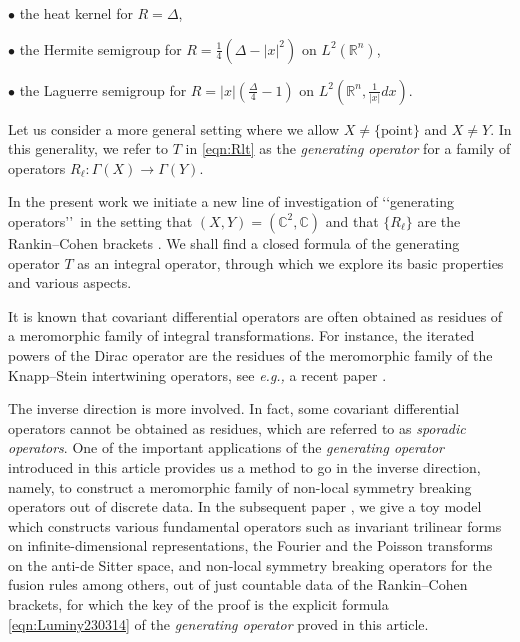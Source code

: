 \documentclass[12pt,leqno]{amsart}
\theoremstyle{plain}
\theoremstyle{definition}
\begin{document}
\par\indent
$\bullet$\enspace
 the heat kernel
 for $R=\Delta$, 

\par\indent
$\bullet$\enspace
the Hermite semigroup
 for $R=\frac 1 4 (\Delta-|x|^2)$  on $L^2({\mathbb{R}}^n)$, 

\par\indent
$\bullet$\enspace
the Laguerre semigroup
 for $R=|x|(\frac{\Delta}4-1)$ on $L^2({\mathbb{R}}^n, \frac{1}{|x|} d x)$.  



Let us consider a more general setting
 where we allow $X \ne \{\text{point}\}$ and $X \ne Y$.  
In this generality, 
 we refer to $T$ in \eqref{eqn:Rlt}
 as the {\it{generating operator}}
 for a family of operators
 $R_{\ell} \colon \Gamma(X) \to \Gamma(Y)$.  



In the present work
 we initiate a new line of investigation of 
\lq\lq{generating operators}\rq\rq\
 in the setting
 that $(X,Y)=({\mathbb{C}}^2, {\mathbb{C}})$
 and that $\{R_{\ell}\}$ are the Rankin--Cohen brackets
\cite{xCo75, xRa56}.  
We shall find a closed formula 
 of the generating operator $T$ as an integral operator, 
 through which we explore its basic properties
 and various aspects.  
\vskip 3pc



It is known
 that covariant differential operators are often obtained as residues
of a meromorphic family of integral transformations. 
For instance, the iterated powers of the Dirac operator are
 the residues of the meromorphic family
 of the Knapp--Stein intertwining operators, 
 see {\it{e.g.,}} a recent paper \cite{CLOR20}. 


The inverse direction is more involved.  In fact, 
 some covariant differential operators cannot be obtained as residues, 
 which are referred to as {\it{sporadic operators}}.  
One of the important applications of the \emph{generating operator} introduced in this article provides us a method
 to go in the inverse direction, 
 namely,
 to construct a meromorphic family of non-local symmetry breaking operators
 out of discrete data.  
In the subsequent paper \cite{K23}, 
 we give a toy model
 which constructs various fundamental operators
 such as invariant trilinear forms
 on infinite-dimensional representations, 
 the Fourier and the Poisson transforms
 on the anti-de Sitter space, 
 and non-local symmetry breaking operators
 for the fusion rules 
 among others, 
 out of just countable data of the Rankin--Cohen brackets, 
 for which the key of the proof is
 the explicit formula \eqref{eqn:Luminy230314}
 of the {\it{generating operator}}
proved in this article.  
\end{document}
